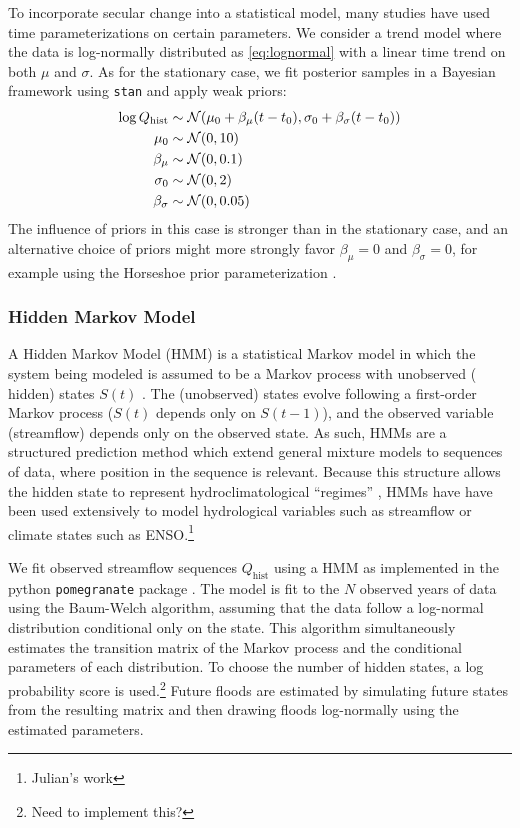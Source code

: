 \documentclass[12pt]{article}
\begin{document}
To incorporate secular change into a statistical model, many studies have used time parameterizations on certain parameters.
We consider a trend model where the data is log-normally distributed as \cref{eq:lognormal} with a linear time trend on both \( \mu \) and \( \sigma \).
As for the stationary case, we fit posterior samples in a Bayesian framework using \texttt{stan} and apply weak priors:
\begin{align}
  \log Q_\text{hist} & \sim \mathcal{N} \qty(\mu_0 + \beta_\mu \qty(t - t_0), \sigma_0 + \beta_\sigma \qty(t-t_0)) \\
  \mu_0 & \sim \mathcal{N} \qty(0, 10) \\
  \beta_\mu & \sim \mathcal{N} \qty(0, 0.1) \\
  \sigma_0 & \sim \mathcal{N} \qty(0, 2) \\
  \beta_\sigma & \sim \mathcal{N} \qty(0, 0.05)
\end{align}
The influence of priors in this case is stronger than in the stationary case, and an alternative choice of priors might more strongly favor \(\beta_\mu=0\) and \(\beta_\sigma=0\), for example using the Horseshoe prior parameterization \citep{Piironen2016a}.

\subsubsection{Hidden Markov Model\label{sec:method-HMM}}

A Hidden Markov Model (HMM) is a statistical Markov model in which the system being modeled is assumed to be a Markov process with unobserved (\ie{} hidden) states \(S(t)\) \citep{Rabiner1986}.
The (unobserved) states evolve following a first-order Markov process (\(S(t)\) depends only on \(S(t-1)\)), and the observed variable (streamflow) depends only on the observed state.
As such, HMMs are a structured prediction method which extend general mixture models to sequences of data, where position in the sequence is relevant.
Because this structure allows the hidden state to represent hydroclimatological ``regimes'' \citep{Reinhold1982,Michelangeli1995,Merz2014}, HMMs have have been used extensively to model hydrological variables such as streamflow \citep[\ie{}][]{Bracken2016} or climate states such as ENSO.\footnote{Julian's work}

We fit observed streamflow sequences \(Q_\text{hist}\) using a HMM as implemented in the python \texttt{pomegranate} package \citep{Schreiber2016}.
The model is fit to the \(N\) observed years of data using the Baum-Welch algorithm, assuming that the data follow a log-normal distribution conditional only on the state.
This algorithm simultaneously estimates the transition matrix of the Markov process and the conditional parameters of each distribution.
To choose the number of hidden states, a log probability score is used.\footnote{Need to implement this?}
Future floods are estimated by simulating future states from the resulting matrix and then drawing floods log-normally using the estimated parameters.
\end{document}
